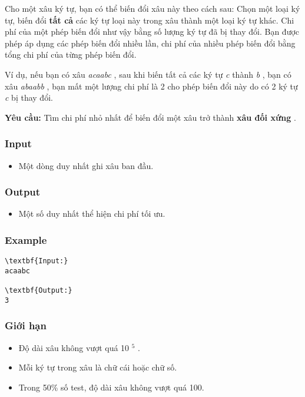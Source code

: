 

Cho một xâu ký tự, bạn có thể biến đổi xâu này theo cách sau: Chọn một loại ký tự, biến đổi \textbf{ tất cả } các ký tự loại này trong xâu thành một loại ký tự khác. Chi phí của một phép biến đổi như vậy bằng số lượng ký tự đã bị thay đổi. Bạn được phép áp dụng các phép biến đổi nhiều lần, chi phí của nhiều phép biến đổi bằng tổng chi phí của từng phép biến đổi.

Ví dụ, nếu bạn có xâu \emph{ acaabc } , sau khi biến tất cả các ký tự \emph{ c } thành \emph{ b } , bạn có xâu \emph{ abaabb } , bạn mất một lượng chi phí là 2 cho phép biến đổi này do có 2 ký tự \emph{ c } bị thay đổi.

\textbf{Yêu cầu: } Tìm chi phí nhỏ nhất để biến đổi một xâu trở thành \textbf{ xâu đối xứng } .

\subsubsection{Input}
\begin{itemize}
	\item Một dòng duy nhất ghi xâu ban đầu.
\end{itemize}

\subsubsection{Output}
\begin{itemize}
	\item Một số duy nhất thể hiện chi phí tối ưu.
\end{itemize}

\subsubsection{Example}
\begin{verbatim}
\textbf{Input:}
acaabc

\textbf{Output:}
3\end{verbatim}

\subsubsection{Giới hạn}
\begin{itemize}
	\item Độ dài xâu không vượt quá 10 $^ 5 $ .
	\item Mỗi ký tự trong xâu là chữ cái hoặc chữ số.
	\item Trong 50\% số test, độ dài xâu không vượt quá 100.
\end{itemize}